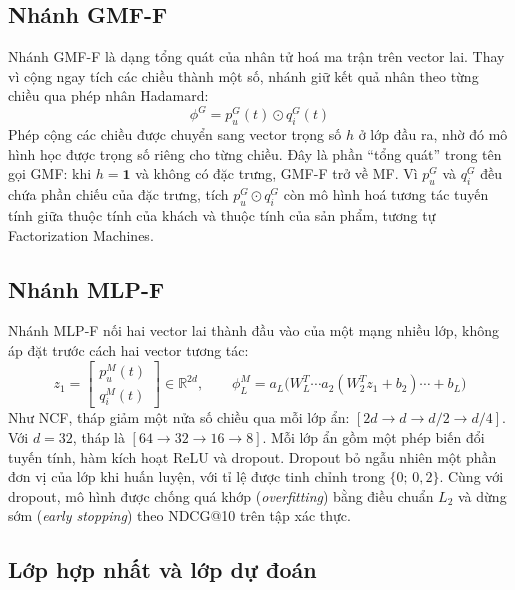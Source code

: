 \subsection{Nhánh GMF-F}
\label{subsec:gmf_design}

Nhánh GMF-F là dạng tổng quát của nhân tử hoá ma trận trên vector lai. Thay vì cộng ngay tích các chiều thành một số, nhánh giữ kết quả nhân theo từng chiều qua phép nhân Hadamard:
\begin{equation*}
    \phi^{G} = p^G_u(t) \odot q^G_i(t)
\end{equation*}
Phép cộng các chiều được chuyển sang vector trọng số $h$ ở lớp đầu ra, nhờ đó mô hình học được trọng số riêng cho từng chiều. Đây là phần ``tổng quát'' trong tên gọi GMF: khi $h = \mathbf{1}$ và không có đặc trưng, GMF-F trở về MF. Vì $p^G_u$ và $q^G_i$ đều chứa phần chiếu của đặc trưng, tích $p^{G}_u \odot q^{G}_i$ còn mô hình hoá tương tác tuyến tính giữa thuộc tính của khách và thuộc tính của sản phẩm, tương tự Factorization Machines.

\subsection{Nhánh MLP-F}
\label{subsec:mlp_design}

Nhánh MLP-F nối hai vector lai thành đầu vào của một mạng nhiều lớp, không áp đặt trước cách hai vector tương tác:
\begin{equation*}
    z_1 = \begin{bmatrix} p^M_u(t) \\ q^M_i(t) \end{bmatrix} \in \mathbb{R}^{2d}, \qquad
    \phi^M_L = a_L\big(W_L^T \cdots a_2(W_2^T z_1 + b_2) \cdots + b_L\big)
\end{equation*}
Như NCF, tháp giảm một nửa số chiều qua mỗi lớp ẩn: $[2d \to d \to d/2 \to d/4]$. Với $d = 32$, tháp là $[64 \to 32 \to 16 \to 8]$. Mỗi lớp ẩn gồm một phép biến đổi tuyến tính, hàm kích hoạt ReLU và dropout. Dropout bỏ ngẫu nhiên một phần đơn vị của lớp khi huấn luyện, với tỉ lệ được tinh chỉnh trong $\{0;\, 0{,}2\}$. Cùng với dropout, mô hình được chống quá khớp (\textit{overfitting}) bằng điều chuẩn $L_2$ và dừng sớm (\textit{early stopping}) theo NDCG@10 trên tập xác thực.

\subsection{Lớp hợp nhất và lớp dự đoán}
\label{subsec:neumf_output}

